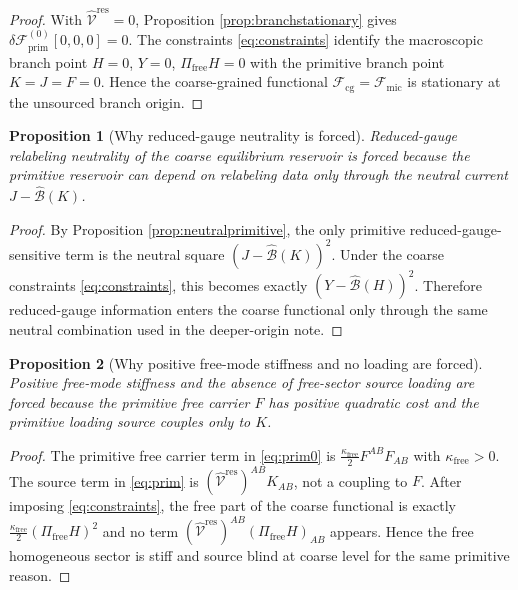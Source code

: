 \documentclass[11pt]{article}
\newcommand{\ResidualLift}{\widehat{\mathcal V}^{\mathrm{res}}}
\newcommand{\SubGaugeVec}{\widehat{\mathcal B}}
\newcommand{\FreeProj}{\Pi_{\mathrm{free}}}
\newcommand{\GaugeAux}{Y}
\newcommand{\MicFunctional}{\mathscr F_{\mathrm{mic}}}
\newcommand{\PrimFunctional}{\mathscr F_{\mathrm{prim}}}
\newcommand{\CoarseFunctional}{\mathscr F_{\mathrm{cg}}}
\newcommand{\FreeStiff}{\kappa_{\mathrm{free}}}
\newcommand{\PrimStrain}{K}
\newcommand{\PrimNeutral}{J}
\newcommand{\PrimFree}{F}
\newtheorem{proposition}{Proposition}
\begin{document}
\begin{proof}
With \(\ResidualLift=0\), Proposition \ref{prop:branchstationary} gives \(\delta \PrimFunctional^{(0)}[0,0,0]=0\). The constraints \eqref{eq:constraints} identify the macroscopic branch point \(H=0\), \(\GaugeAux=0\), \(\FreeProj H=0\) with the primitive branch point \(\PrimStrain=\PrimNeutral=\PrimFree=0\). Hence the coarse-grained functional \(\CoarseFunctional=\MicFunctional\) is stationary at the unsourced branch origin.
\end{proof}

\begin{proposition}[Why reduced-gauge neutrality is forced]
\label{prop:forcedneutral}
Reduced-gauge relabeling neutrality of the coarse equilibrium reservoir is forced because the primitive reservoir can depend on relabeling data only through the neutral current \(\PrimNeutral-\SubGaugeVec(\PrimStrain)\).
\end{proposition}

\begin{proof}
By Proposition \ref{prop:neutralprimitive}, the only primitive reduced-gauge-sensitive term is the neutral square \((\PrimNeutral-\SubGaugeVec(\PrimStrain))^2\). Under the coarse constraints \eqref{eq:constraints}, this becomes exactly \((\GaugeAux-\SubGaugeVec(H))^2\). Therefore reduced-gauge information enters the coarse functional only through the same neutral combination used in the deeper-origin note.
\end{proof}

\begin{proposition}[Why positive free-mode stiffness and no loading are forced]
\label{prop:forcedfree}
Positive free-mode stiffness and the absence of free-sector source loading are forced because the primitive free carrier \(\PrimFree\) has positive quadratic cost and the primitive loading source couples only to \(\PrimStrain\).
\end{proposition}

\begin{proof}
The primitive free carrier term in \eqref{eq:prim0} is \(\frac{\FreeStiff}{2}\PrimFree^{AB}\PrimFree_{AB}\) with \(\FreeStiff>0\). The source term in \eqref{eq:prim} is \((\ResidualLift)^{AB}\PrimStrain_{AB}\), not a coupling to \(\PrimFree\). After imposing \eqref{eq:constraints}, the free part of the coarse functional is exactly \(\frac{\FreeStiff}{2}(\FreeProj H)^2\) and no term \((\ResidualLift)^{AB}(\FreeProj H)_{AB}\) appears. Hence the free homogeneous sector is stiff and source blind at coarse level for the same primitive reason.
\end{proof}
\end{document}
